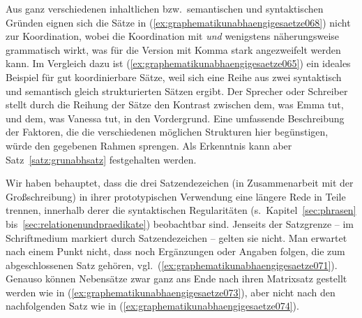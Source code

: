 Aus ganz verschiedenen inhaltlichen bzw.\ semantischen und syntaktischen Gründen eignen sich die Sätze in (\ref{ex:graphematikunabhaengigesaetze068}) nicht zur Koordination, wobei die Koordination mit \textit{und} wenigstens näherungsweise grammatisch wirkt, was für die Version mit Komma stark angezweifelt werden kann.
Im Vergleich dazu ist (\ref{ex:graphematikunabhaengigesaetze065}) ein ideales Beispiel für gut koordinierbare Sätze, weil sich eine Reihe aus zwei syntaktisch und semantisch gleich strukturierten Sätzen ergibt.
Der Sprecher oder Schreiber stellt durch die Reihung der Sätze den Kontrast zwischen dem, was Emma tut, und dem, was Vanessa tut, in den Vordergrund.
Eine umfassende Beschreibung der Faktoren, die die verschiedenen möglichen Strukturen hier begünstigen, würde den gegebenen Rahmen sprengen.
Als Erkenntnis kann aber Satz~\ref{satz:grunabhsatz} festgehalten werden.


Wir haben behauptet, dass die drei Satzendezeichen (in Zusammenarbeit mit der Großschreibung) in ihrer prototypischen Verwendung eine längere Rede in Teile trennen, innerhalb derer die syntaktischen Regularitäten (s.\ Kapitel~\ref{sec:phrasen} bis~\ref{sec:relationenundpraedikate}) beobachtbar sind.
Jenseits der Satzgrenze -- im Schriftmedium markiert durch Satzendezeichen -- gelten sie nicht.
Man erwartet \zB nach einem Punkt nicht, dass noch Ergänzungen oder Angaben folgen, die zum abgeschlossenen Satz gehören, vgl.\ (\ref{ex:graphematikunabhaengigesaetze071}).
Genauso können Nebensätze zwar ganz ans Ende nach ihren Matrixsatz gestellt werden wie in (\ref{ex:graphematikunabhaengigesaetze073}), aber nicht nach den nachfolgenden Satz wie in (\ref{ex:graphematikunabhaengigesaetze074}).

\begin{exe}
  \ex\label{ex:graphematikunabhaengigesaetze072}
  \begin{xlist}
  \end{xlist}
\end{exe}


